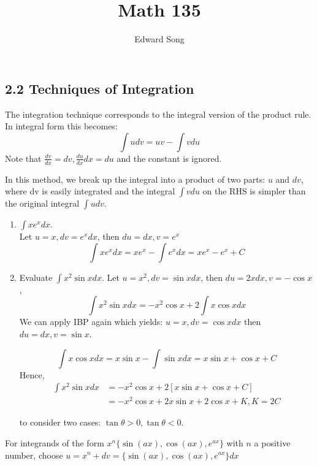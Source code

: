 \documentclass[11pt]{article}
\title{Math 135}
\author{Edward Song}
\theoremstyle{plain}
\theoremstyle{remark}
\theoremstyle{plain}
\begin{document}
\subsection*{2.2 Techniques of Integration}
The integration technique corresponds to the integral version of the product rule.\\

In integral form this becomes:\[\int udv=uv-\int vdu\]
Note that $\frac{dv}{dx}=dv, \frac{du}{dx}dx=du$ and the constant is ignored.

In this method, we break up the integral into a product of two parts: $u$ and $dv$, where dv is easily integrated and the integral
$\int vdu$ on the RHS is simpler than the original integral $\int u dv$.

\begin{tcolorbox}[colback=magenta!5!white,colframe=magenta!75!black,title=Example]
   \begin{enumerate}
       \item $\int xe^xdx$. \\
       
       Let $u=x, dv=e^xdx$, then $du=dx, v=e^x$
       \[\int xe^xdx = xe^x-\int e^xdx=xe^x-e^x+C\]
       \item Evaluate $\int x^2\sin xdx$. Let $u=x^2, dv=\sin x dx$, then $du=2xdx, v=-\cos x$,
       \[\int x^2\sin xdx = -x^2\cos x+2\int x\cos xdx\]
       We can apply IBP again which yields: $u=x, dv=\cos x dx$ then $du=dx, v=\sin x$.

        \[\int x\cos xdx=x\sin x-\int \sin x dx=x\sin x+\cos x+C\]Hence,
       \begin{align*}
           \int x^2\sin x dx&=-x^2\cos x+2[x\sin x+\cos x+C]\\
           &=-x^2\cos x+2x\sin x+2\cos x+K, K=2C
       \end{align*}
      
       to consider two cases: $\tan\theta>0,\tan\theta<0$.
   \end{enumerate}
\end{tcolorbox}   
\begin{tcolorbox}[colback=red!5!white,colframe=red!75!black,title=Remark ]
        For integrands of the form $x^n \{\sin(ax), \cos(ax), e^{ax}\}$ with $n$ a
        positive number, choose $u=x^n+dv=\{\sin(ax), \cos(ax), e^{ax}\}dx$
\end{tcolorbox}   
\end{document}
